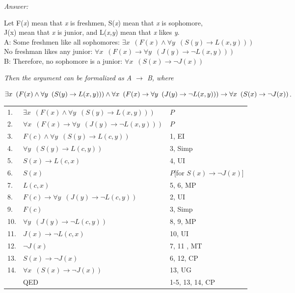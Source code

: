 \documentclass[12pt]{article}
\begin{document}
\emph{Answer:}

\begin{center}
Let F(\emph{x}) mean that \emph{x} is freshmen, S(\emph{x}) mean that \emph{x} is sophomore, \\
J(x) mean that \emph{x} is junior, and L(\emph{x,y}) mean that \emph{x} likes \emph{y}. \\
A: Some freshmen like all sophomores: $\exists x \enspace (F(x) \land \forall y \enspace 
(S(y) \rightarrow L(x, y)))$ \\
No freshman likes any junior: $\forall x \enspace (F(x) \rightarrow \forall y \enspace (J(y) \rightarrow \neg L(x,y)))$\\
B: Therefore, no sophomore is a junior: $\forall x \enspace (S(x) \rightarrow \neg J(x))$ \\
\end{center}

\emph{Then the argument can be formalized as A $\rightarrow$ B, where}

$\exists x \enspace (F(x) \land \forall y \enspace 
(S(y) \rightarrow L(x, y))) \land \forall x \enspace (F(x) \rightarrow \forall y 
\enspace (J(y) \rightarrow \neg L(x,y))) \\
\rightarrow \forall x \enspace (S(x) \rightarrow \neg J(x))$.

\begin{tabular}{p{.8cm}p{8.5cm}l}
1. & $\exists x \enspace (F(x) \land \forall y \enspace 
     (S(y) \rightarrow L(x, y)))$ & $P$ \\
2. & $\forall x \enspace (F(x) \rightarrow \forall y 
     \enspace (J(y) \rightarrow \neg L(x,y)))$ & $P$ \\
3. & $F(c) \land \forall y \enspace (S(y) \rightarrow L(c, y))$ & 1, EI \\
4. & $\forall y \enspace (S(y) \rightarrow L(c, y))$ & 3, Simp \\
5. & $S(x) \rightarrow L(c, x)$ & 4, UI \\
6. & \qquad $S(x)$ & $P$[for $S(x) \rightarrow \neg J(x)$] \\
7. & \qquad $L(c, x)$ & 5, 6, MP \\
8. & \qquad $F(c) \rightarrow \forall y \enspace (J(y) \rightarrow \neg L(c,y))$ & 2, UI \\
9. & \qquad $F(c)$ & 3, Simp \\
10. & \qquad $\forall y \enspace (J(y) \rightarrow \neg L(c,y))$ & 8, 9, MP \\
11. & \qquad $J(x) \rightarrow \neg L(c, x)$  & 10, UI \\
12. & \qquad $\neg J(x)$ & 7, 11 , MT \\
13. & \qquad $S(x) \rightarrow \neg J(x)$ & 6, 12, CP \\
14. & $\forall x \enspace (S(x) \rightarrow \neg J(x))$ & 13, UG \\
& QED & 1-5, 13, 14, CP \\
\end{tabular}
\end{document}
